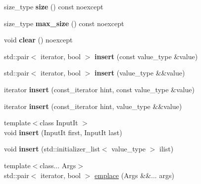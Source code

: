 \begin{DoxyCompactItemize}
\mbox{\label{classtsl_1_1ordered__set_a1fa37a53d11a5076aaeb33353028f4d7}} 
size\+\_\+type {\bfseries size} () const noexcept
\item 
\mbox{\label{classtsl_1_1ordered__set_a32a7b4a8594e064e79b47fc6a502f436}} 
size\+\_\+type {\bfseries max\+\_\+size} () const noexcept
\item 
\mbox{\label{classtsl_1_1ordered__set_acbec08c6e8d45c108e5690bfffe12cd5}} 
void {\bfseries clear} () noexcept
\item 
\mbox{\label{classtsl_1_1ordered__set_a328a20c731b0e04d44d494c5f43ef8de}} 
std\+::pair$<$ iterator, bool $>$ {\bfseries insert} (const value\+\_\+type \&value)
\item 
\mbox{\label{classtsl_1_1ordered__set_aa7b6e9cf63b58ec83966f5d97661583d}} 
std\+::pair$<$ iterator, bool $>$ {\bfseries insert} (value\+\_\+type \&\&value)
\item 
\mbox{\label{classtsl_1_1ordered__set_a2459ce77751afca0043efcce1eb09cd5}} 
iterator {\bfseries insert} (const\+\_\+iterator hint, const value\+\_\+type \&value)
\item 
\mbox{\label{classtsl_1_1ordered__set_abbba255e05528bca39a13ae86b5035c6}} 
iterator {\bfseries insert} (const\+\_\+iterator hint, value\+\_\+type \&\&value)
\item 
\mbox{\label{classtsl_1_1ordered__set_a9621d330cbf43fec798bc63d191ed034}} 
{\footnotesize template$<$class Input\+It $>$ }\\void {\bfseries insert} (Input\+It first, Input\+It last)
\item 
\mbox{\label{classtsl_1_1ordered__set_a206421a6a18589f4bd7562c2db43d910}} 
void {\bfseries insert} (std\+::initializer\+\_\+list$<$ value\+\_\+type $>$ ilist)
\item 
{\footnotesize template$<$class... Args$>$ }\\std\+::pair$<$ iterator, bool $>$ \mbox{\hyperlink{classtsl_1_1ordered__set_ad4a8ee2e57f3c30fe19b326a874f0bd5}{emplace}} (Args \&\&... args)

\end{DoxyCompactItemize}
